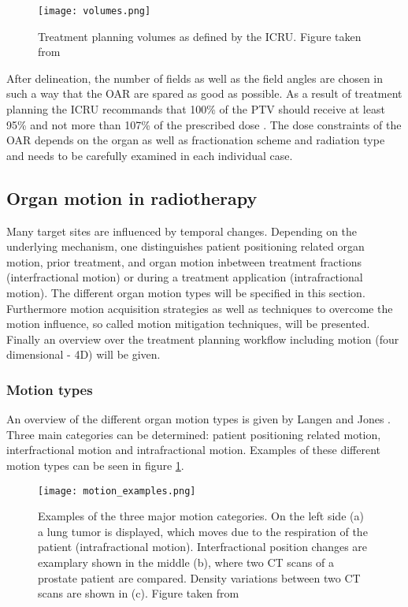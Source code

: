 \documentclass[type=dr, dr=rernat, accentcolor=tud7b,colorbacktitle, bigchapter, openright, twoside, 12pt ]{tudthesis}
\begin{document}
\begin{figure}[H]
\begin{center}
\texttt{[image: volumes.png]}
\caption{Treatment planning volumes as defined by the ICRU. Figure taken from \cite{Ric12}}
\end{center}
\end{figure}

\vspace*{-0.3cm}

After delineation, the number of fields as well as the field angles are chosen in such a way that the OAR are spared as good as possible. 
As a result of treatment planning the ICRU recommands that 100\% of the PTV should receive at least 95\% and 
not more than 107\% of the prescribed dose \cite{ICRU93a}. The dose constraints of the OAR depends on the organ as well as fractionation 
scheme and radiation type and needs to be carefully examined in each individual case. 



\subsection{Organ motion in radiotherapy}

Many target sites are influenced by temporal changes. Depending on the underlying mechanism, one distinguishes patient positioning 
related organ motion, prior treatment, and organ motion inbetween treatment fractions (interfractional motion) or during a treatment 
application (intrafractional motion). The different organ motion types will be specified in this section. Furthermore motion acquisition 
strategies as well as techniques to overcome the motion influence, so called motion mitigation techniques, will be presented. Finally an 
overview over the treatment planning workflow including motion (four dimensional - 4D) will be given. 

\subsubsection{Motion types}

An overview of the different organ motion types is given by Langen and Jones \cite{Lan01}. Three main categories can be determined: 
patient positioning related motion, interfractional motion and intrafractional motion. Examples of these different motion types can be 
seen in figure \ref{motion}.

\begin{figure}[H]
\begin{center}
\texttt{[image: motion\_examples.png]}
\caption{Examples of the three major motion categories. On the left side (a) a lung tumor is displayed, which moves due to the respiration 
of the patient (intrafractional motion). Interfractional position changes are examplary shown in the middle (b), where two CT scans of a 
prostate patient are compared. Density variations between two CT scans are shown in (c). Figure taken from \cite{Eng11}}
\label{motion}
\end{center}
\end{figure}
\end{document}
